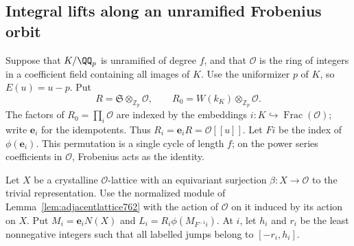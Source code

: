 \documentclass[a4paper,11pt]{article}
\theoremstyle{definition}
\theoremstyle{remark}
\newcommand{\ZZ}{\mathbb Z}\newcommand{\ord}{\operatorname{ord}}
\numberwithin{equation}{section}
\begin{document}
\subsection{Integral lifts along an unramified Frobenius orbit}
\label{sec:labelledlifts764}
Suppose that \(K/\QQ_p\) is unramified of degree \(f\), and
that \(\mathcal O\) is the ring of integers in a coefficient
field containing all images of \(K\). Use the uniformizer \(p\)
of \(K\), so \(E(u)=u-p\). Put
\[
 R=\mathfrak S\otimes_{\ZZ_p}\mathcal O,\qquad
 R_0=W(k_K)\otimes_{\ZZ_p}\mathcal O.
\]
The factors of \(R_0=\prod_i\mathcal O\) are indexed by
the embeddings \(i:K\hookrightarrow\operatorname{Frac}(\mathcal O)\);
write \(\mathbf e_i\) for the idempotents. Thus
\(R_i=\mathbf e_i R=\mathcal O[[u]]\). Let \(F i\) be the index
of \(\phi(\mathbf e_i)\). This permutation is a single cycle
of length \(f\); on the power series coefficients in
\(\mathcal O\), Frobenius acts as the identity.

Let \(X\) be a crystalline \(\mathcal O\)-lattice with an
equivariant surjection \(\beta:X\to\mathcal O\) to the
trivial representation. Use the normalized module
of Lemma~\ref{lem:adjacentlattice762} with the action of
\(\mathcal O\) on it induced by its action on \(X\).
Put \(M_i=\mathbf e_i N(X)\) and
\(L_i=R_i\phi(M_{F^{-1}i})\). At \(i\), let \(h_i\) and
\(r_i\) be the least nonnegative integers such that all
labelled jumps belong to \([-r_i,h_i]\).
\end{document}
